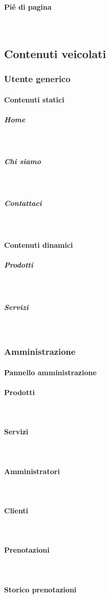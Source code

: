 \paragraph{Pié di pagina}
~\\
\subsection{Contenuti veicolati}

\subsubsection{Utente generico}

\paragraph{Contenuti statici}
\subparagraph{Home}
~\\
\subparagraph{Chi siamo}
~\\
\subparagraph{Contattaci}
~\\

\paragraph{Contenuti dinamici}
\subparagraph{Prodotti} 
~\\

\subparagraph{Servizi} 
~\\

\subsubsection{Amministrazione}

\paragraph{Pannello amministrazione} 
\paragraph{Prodotti}
~\\
\paragraph{Servizi}
~\\
\paragraph{Amministratori}
~\\
\paragraph{Clienti}
~\\

\paragraph{Prenotazioni}
~\\

\paragraph{Storico prenotazioni}
~\\











